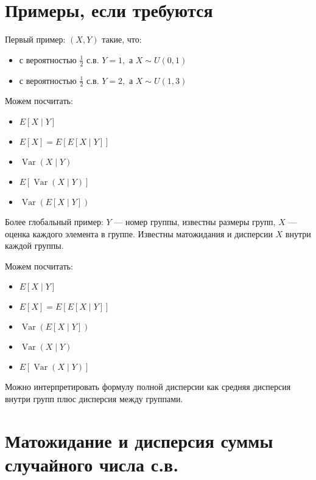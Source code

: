 \documentclass[12pt]{article}
\DeclareMathOperator{\Var}{Var}
\begin{document}
\section{Примеры, если требуются}

Первый пример: $(X, Y)$ такие, что:
\begin{itemize}
  \item с вероятностью $\frac 12$ с.в. $Y = 1,$ а $X \sim U(0, 1)$
  \item с вероятностью $\frac 12$ с.в. $Y = 2,$ а $X \sim U(1, 3)$
\end{itemize}

Можем посчитать:
\begin{itemize}
  \item $E[X \mid Y]$
  \item $E[X] = E[E[X \mid Y]]$
  \item $\Var(X \mid Y)$
  \item $E[\Var(X \mid Y)]$
  \item $\Var(E[X \mid Y])$
\end{itemize}

Более глобальный пример: $Y$ --- номер группы, известны размеры групп, $X$ --- оценка каждого элемента в группе. Известны матожидания и дисперсии $X$ внутри каждой группы.

Можем посчитать:
\begin{itemize}
  \item $E[X \mid Y]$
  \item $E[X] = E[E[X \mid Y]]$
  \item $\Var(E[X \mid Y])$
  \item $\Var(X \mid Y)$
  \item $E[\Var(X \mid Y)]$
\end{itemize}
Можно интерпретировать формулу полной дисперсии как средняя дисперсия внутри групп плюс дисперсия между группами.

\section{Матожидание и дисперсия суммы случайного числа с.в.}
\end{document}
